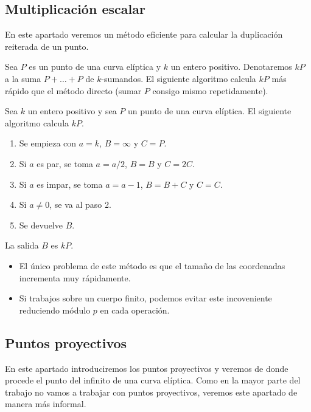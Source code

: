\subsection{Multiplicación escalar}
\label{sub:Multiplicación escalar}

En este apartado veremos un método eficiente para calcular la duplicación reiterada de un punto.

Sea $P$ es un punto de una curva elíptica y $k$ un entero positivo. Denotaremos $k P$ a la suma $P + \ldots + P$ de $k$-sumandos. El siguiente algoritmo calcula $k P$ más rápido que el método directo (sumar $P$ consigo mismo repetidamente).

\begin{algoritmo}\label{al:multiplicación por duplicación}
	Sea $k$ un entero positivo y sea $P$ un punto de una curva elíptica. El siguiente algoritmo calcula $kP$.
	\begin{enumerate}
		\item Se empieza con $a = k$, $B = \infty$ y $C = P$.
		\item Si $a$ es par, se toma $a = a/2$, $B = B$ y $C = 2 C$.
		\item Si $a$ es impar, se toma $a = a -1$, $B = B + C$ y $C = C$.
		\item Si $a \neq 0$, se va al paso 2.
		\item Se devuelve $B$.
	\end{enumerate}
	La salida $B$ es $kP$.
\end{algoritmo}

\begin{nota}\leavevmode
	\begin{itemize}
		\item El único problema de este método es que el tamaño de las coordenadas incrementa muy rápidamente.
		\item Si trabajos sobre un cuerpo finito, podemos evitar este incoveniente reduciendo módulo $p$ en cada operación.
	\end{itemize}
\end{nota}

\subsection{Puntos proyectivos}
\label{sub:Puntos proyectivos}

En este apartado introduciremos los puntos proyectivos y veremos de donde procede el punto del infinito de una curva elíptica. Como en la mayor parte del trabajo no vamos a trabajar con puntos proyectivos, veremos este apartado de manera más informal.

